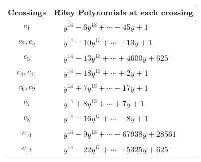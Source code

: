 \documentclass[1p]{elsarticle_modified}
\theoremstyle{definition}
\begin{document}
\begin{tabular}{m{50pt}|m{274pt}}
Crossings & \hspace{64pt}Riley Polynomials at each crossing \\
\hline $$\begin{aligned}c_{1}\end{aligned}$$&$\begin{aligned}
&y^{14}-6 y^{13}+\cdots-45 y+1
\end{aligned}$\\
\hline $$\begin{aligned}c_{2},c_{5}\end{aligned}$$&$\begin{aligned}
&y^{14}-10 y^{13}+\cdots-13 y+1
\end{aligned}$\\
\hline $$\begin{aligned}c_{3}\end{aligned}$$&$\begin{aligned}
&y^{14}-13 y^{13}+\cdots+4600 y+625
\end{aligned}$\\
\hline $$\begin{aligned}c_{4},c_{11}\end{aligned}$$&$\begin{aligned}
&y^{14}-18 y^{13}+\cdots+2 y+1
\end{aligned}$\\
\hline $$\begin{aligned}c_{6},c_{9}\end{aligned}$$&$\begin{aligned}
&y^{14}+7 y^{13}+\cdots-17 y+1
\end{aligned}$\\
\hline $$\begin{aligned}c_{7}\end{aligned}$$&$\begin{aligned}
&y^{14}+8 y^{13}+\cdots+7 y+1
\end{aligned}$\\
\hline $$\begin{aligned}c_{8}\end{aligned}$$&$\begin{aligned}
&y^{14}-16 y^{13}+\cdots-8 y+1
\end{aligned}$\\
\hline $$\begin{aligned}c_{10}\end{aligned}$$&$\begin{aligned}
&y^{14}-9 y^{13}+\cdots-67938 y+28561
\end{aligned}$\\
\hline $$\begin{aligned}c_{12}\end{aligned}$$&$\begin{aligned}
&y^{14}-22 y^{13}+\cdots-5325 y+625
\end{aligned}$\\
\hline
\end{tabular}\\~\\
\end{document}
